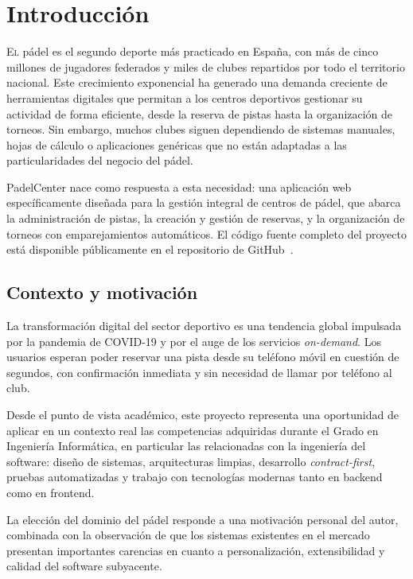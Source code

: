 \chapter{Introducción}
\label{chap:introducion}

\lettrine{E}{l} pádel es el segundo deporte más practicado en España, con más de
cinco millones de jugadores federados y miles de clubes repartidos por todo el
territorio nacional. Este crecimiento exponencial ha generado una demanda
creciente de herramientas digitales que permitan a los centros deportivos gestionar
su actividad de forma eficiente, desde la reserva de pistas hasta la organización
de torneos. Sin embargo, muchos clubes siguen dependiendo de sistemas manuales,
hojas de cálculo o aplicaciones genéricas que no están adaptadas a las
particularidades del negocio del pádel.

PadelCenter nace como respuesta a esta necesidad: una aplicación web específicamente
diseñada para la gestión integral de centros de pádel, que abarca la administración
de pistas, la creación y gestión de reservas, y la organización de torneos con
emparejamientos automáticos. El código fuente completo del proyecto está disponible
públicamente en el repositorio de GitHub~\cite{padelcenterRepo}.

\section{Contexto y motivación}
\label{sec:contexto}

La transformación digital del sector deportivo es una tendencia global impulsada
por la pandemia de COVID-19 y por el auge de los servicios \textit{on-demand}.
Los usuarios esperan poder reservar una pista desde su teléfono móvil en cuestión
de segundos, con confirmación inmediata y sin necesidad de llamar por teléfono
al club.

Desde el punto de vista académico, este proyecto representa una oportunidad de
aplicar en un contexto real las competencias adquiridas durante el Grado en
Ingeniería Informática, en particular las relacionadas con la ingeniería del
software: diseño de sistemas, arquitecturas limpias, desarrollo \textit{contract-first},
pruebas automatizadas y trabajo con tecnologías modernas tanto en backend como
en frontend.

La elección del dominio del pádel responde a una motivación personal del autor,
combinada con la observación de que los sistemas existentes en el mercado presentan
importantes carencias en cuanto a personalización, extensibilidad y calidad del
software subyacente.

